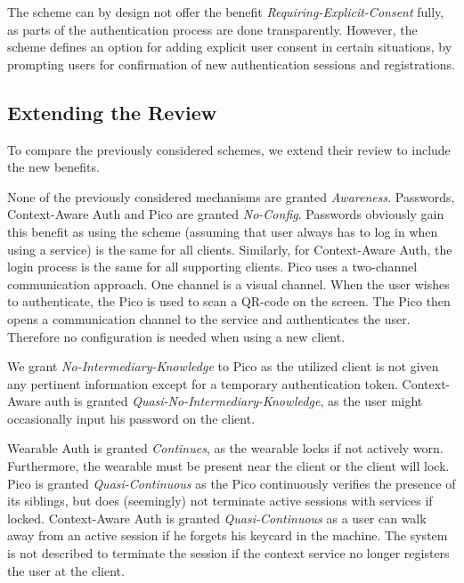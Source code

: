 The scheme can by design not offer the benefit \textit{Requiring-Explicit-Consent} fully, as parts of the authentication process are done transparently. However, the scheme defines an option for adding explicit user consent in certain situations, by prompting users for confirmation of new authentication sessions and registrations. 



\subsection{Extending the Review}\label{sec:results_overview}

To compare the previously considered schemes, we extend their review to include the new benefits.

None of the previously considered mechanisms are granted \textit{Awareness}. Passwords, Context-Aware Auth and Pico are granted \textit{No-Config}. Passwords obviously gain this benefit as using the scheme (assuming that user always has to log in when using a service) is the same for all clients. Similarly, for Context-Aware Auth, the login process is the same for all supporting clients. Pico uses a two-channel communication approach. One channel is a visual channel. When the user wishes to authenticate, the Pico is used to scan a QR-code on the screen. The Pico then opens a communication channel to the service and authenticates the user. Therefore no configuration is needed when using a new client.

We grant \textit{No-Intermediary-Knowledge} to Pico as the utilized client is not given any pertinent information except for a temporary authentication token. Context-Aware auth is granted \textit{Quasi-No-Intermediary-Knowledge}, as the user might occasionally input his password on the client.

Wearable Auth is granted \textit{Continues}, as the wearable locks if not actively worn. Furthermore, the wearable must be present near the client or the client will lock. Pico is granted \textit{Quasi-Continuous} as the Pico continuously verifies the presence of its siblings, but does (seemingly) not terminate active sessions with services if locked. Context-Aware Auth is granted \textit{Quasi-Continuous} as a user can walk away from an active session if he forgets his keycard in the machine. The system is not described to terminate the session if the context service no longer registers the user at the client.


